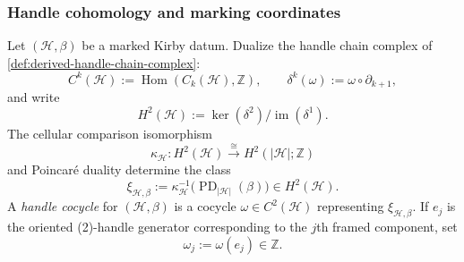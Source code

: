 \subsubsection{Handle cohomology and marking coordinates}
\label{subsec:handle-cohomology-markings}

\begin{definition}
\label{def:handle-cocycle}
Let \((\mathcal H,\beta)\) be a marked Kirby datum.  Dualize the handle
chain complex of \cref{def:derived-handle-chain-complex}:
\[
  C^k(\mathcal H):=\operatorname{Hom}(C_k(\mathcal H),\mathbb Z),
  \qquad
  \delta^k(\omega):=\omega\circ\partial_{k+1},
\]
and write
\[
  H^2(\mathcal H):=
  \ker(\delta^2)/\operatorname{im}(\delta^1).
\]
The cellular comparison isomorphism
\[
  \kappa_{\mathcal H}\colon
  H^2(\mathcal H)\xrightarrow{\ \cong\ }
  H^2(|\mathcal H|;\mathbb Z)
\]
and Poincar\'e duality determine the class
\[
  \xi_{\mathcal H,\beta}
  :=\kappa_{\mathcal H}^{-1}
    \bigl(\operatorname{PD}_{|\mathcal H|}(\beta)\bigr)
  \in H^2(\mathcal H).
\]
A \emph{handle cocycle} for \((\mathcal H,\beta)\) is a cocycle
\(\omega\in C^2(\mathcal H)\) representing \(\xi_{\mathcal H,\beta}\).
If \(e_j\) is the oriented (2)-handle generator corresponding to the
\(j\)th framed component, set
\[
  \omega_j:=\omega(e_j)\in\mathbb Z.
\]
\end{definition}

